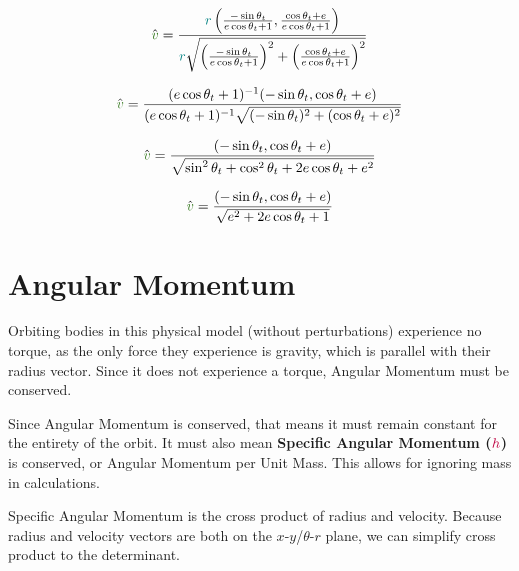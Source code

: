 $$\hat{\vel}=\frac{\rad\left(\frac{-\sin{\true}}{\e\cos{\true}+1},\frac{\cos{\true}+\e} {\e\cos{\true}+1}\right)}{\rad\sqrt{\left(\frac{-\sin{\true}}{\e\cos{\true}+1}\right)^2+\left(\frac{\cos{\true}+\e}{\e\cos{\true}+1}\right)^2}}$$

$$\hat{\vel}=\frac{(\e\cos{\true}+1)^{-1}(-\sin{\true},\cos{\true}+\e)} {(\e\cos{\true}+1)^{-1}\sqrt{(-\sin{\true})^2+(\cos{\true}+\e)^2}}$$

$$\hat{\vel}=\frac{(-\sin{\true},\cos{\true}+\e)} {\sqrt{\sin^2{\true}+\cos^2{\true}+2\e\cos{\true} + \e^2}}$$

$$\hat{\vel}=\frac{(-\sin{\true},\cos{\true}+\e)} {\sqrt{\e^2+2\e\cos{\true}+1}}$$
\normalsize
\section{Angular Momentum}

Orbiting bodies in this physical model (without perturbations) experience no torque, as the only force they experience is gravity, which is parallel with their radius vector. Since it does not experience a torque, Angular Momentum must be conserved.

Since Angular Momentum is conserved, that means it must remain constant for the entirety of the orbit. It must also mean \textbf{Specific Angular Momentum ($\textcolor{purple}{h}$)} is conserved, or Angular Momentum per Unit Mass. This allows for ignoring mass in calculations. 

Specific Angular Momentum is the cross product of radius and velocity. Because radius and velocity vectors are both on the $x$-$y$/$\theta$-$r$ plane, we can simplify cross product to the determinant.

